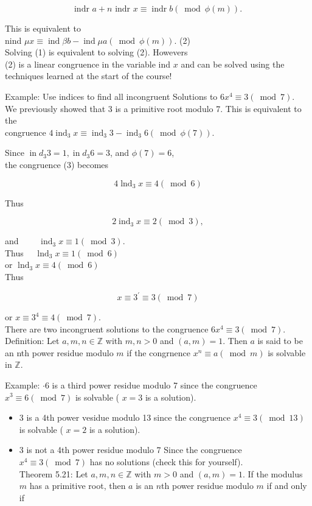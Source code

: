 \documentclass[10pt]{article}
\begin{document}
$$
\text { indr } a+n \text { indr } x \equiv \operatorname{indr} b(\bmod \phi(m)) \text {. }
$$

This is equivalent to\\
nind $\mu x \equiv \operatorname{ind} \beta b-\operatorname{ind} \mu a(\bmod \phi(m))$. (2)\\
Solving (1) is equivalent to solving (2). Howevers\\
(2) is a linear congruence in the variable ind $x$ and can be solved using the techniques learned at the start of the course!

Example: Use indices to find all incongruent Solutions to $6 x^{4} \equiv 3(\bmod 7)$.\\
We previously showed that 3 is a primitive root modulo 7. This is equivalent to the\\
congruence $4 \operatorname{ind}_{3} x \equiv \operatorname{ind}_{3} 3-\operatorname{ind}_{3} 6(\bmod \phi(7))$.

Since $\operatorname{in} d_{3} 3=1, \operatorname{in} d_{3} 6=3$, and $\phi(7)=6$,\\
the congruence (3) becomes

$$
4 \operatorname{lnd}_{3} x \equiv 4(\bmod 6)
$$

Thus

$$
2 \operatorname{ind}_{3} x \equiv 2(\bmod 3),
$$

and $\quad \quad \operatorname{ind}_{3} x \equiv 1(\bmod 3)$.\\
Thus $\quad \operatorname{lnd}_{3} x \equiv 1(\bmod 6)$\\
or $\operatorname{lnd}_{3} x \equiv 4(\bmod 6)$\\
Thus

$$
x \equiv 3^{\prime} \equiv 3(\bmod 7)
$$

or $x \equiv 3^{4} \equiv 4(\bmod 7)$.\\
There are two incongruent solutions to the congruence $6 x^{4} \equiv 3(\bmod 7)$.\\
Definition: Let $a, m, n \in \mathbb{Z}$ with $m, n>0$ and $(a, m)=1$. Then $a$ is said to be an nth power residue modulo $m$ if the congrnence $x^{n} \equiv a(\bmod m)$ is solvable in $\mathbb{Z}$.

Example: $\cdot 6$ is a third power residue modulo 7 since the congruence $x^{3} \equiv 6(\bmod 7)$ is solvable ( $x=3$ is a solution).

\begin{itemize}
  \item 3 is a 4th power vesidue modulo 13 since the congruence $x^{4} \equiv 3(\bmod 13)$ is solvable ( $x=2$ is a solution).
  \item 3 is not a 4th power residue modulo 7 Since the congruence $x^{4} \equiv 3(\bmod 7)$ has no solutions (check this for yourself).\\
Theorem 5.21: Let $a, m, n \in \mathbb{Z}$ with $m>0$ and $(a, m)=1$. If the modulus $m$ has a primitive root, then $a$ is an $n$th power residue modulo $m$ if and only if
\end{itemize}
\end{document}
